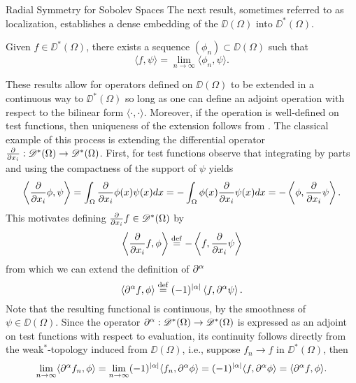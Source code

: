 \begin{chapter}{Radial Symmetry for Sobolev Spaces}
The next result, sometimes referred to as localization, establishes a dense embedding of the $\DD(\Omega)$ into $\DD^*(\Omega)$.
\begin{thm} \label{thm:localization}
  Given $f\in \DD^*(\Omega)$, there exists a sequence $(\phi_n) \subset \DD(\Omega)$ such that 
  \begin{equation}
    \langle f,\psi\rangle = \lim_{n\to\infty}\langle \phi_n,\psi\rangle.
  \end{equation}
\end{thm}

These results allow for operators defined on $\DD(\Omega)$ to be extended in a continuous way to $\DD^*(\Omega)$ so long as one can define an adjoint operation with respect to the bilinear form $\langle \cdot,\cdot \rangle$.
Moreover, if the operation is well-defined on test functions, then uniqueness of the extension follows from .
The classical example of this process is extending the differential operator $\frac{\partial}{\partial x_i}:\mathscr D^*(\Omega) \to \mathscr D^*(\Omega)$. 
First, for test functions observe that integrating by parts and using the compactness of the support of $\psi$ yields
\begin{equation}
  \left\langle \frac{\partial}{\partial x_i} \phi,\psi \right\rangle = \int_{\Omega} \frac{\partial}{\partial x_i} \phi(x) \psi(x) dx = - \int_{\Omega}\phi(x) \frac{\partial}{\partial x_i} \psi(x)dx =- \left\langle \phi, \frac{\partial}{\partial x_i} \psi\right\rangle.
\end{equation}
This motivates defining $\frac{\partial}{\partial x_i} f \in \mathscr D^*(\Omega)$ by
\begin{equation}
  \left\langle \frac{\partial}{\partial x_i} f, \phi \right\rangle 
    \stackrel{\rm def}{=}  - \left\langle f, \frac{\partial}{\partial x_i} \psi\right\rangle
\end{equation}
from which we can extend the definition of $\partial^\alpha$
\begin{equation}\label{eq:distributionalDerivative}
  \left\langle \partial^\alpha f, \phi \right\rangle 
    \stackrel{\rm def}{=}  (-1)^{|\alpha|} \left\langle f, \partial^\alpha \psi\right\rangle.
\end{equation}
Note that the resulting functional is continuous, by the smoothness of $\psi \in \DD(\Omega)$.
Since the operator $\partial^\alpha:\mathscr D^*(\Omega)\to\mathscr D^*(\Omega)$ is expressed as an adjoint on test functions with respect to evaluation, its continuity follows directly from the weak$^*$-topology induced from $\DD(\Omega)$, i.e., suppose $f_n \to f$ in $\DD^*(\Omega)$, then
\begin{align}
  \lim_{n\to \infty}\langle \partial^{\alpha}f_n, \phi\rangle 
  = \lim_{n\to\infty}(-1)^{|\alpha|} \langle f_n,\partial^{\alpha}\phi\rangle
  = (-1)^{|\alpha|} \langle f,\partial^{\alpha}\phi\rangle
  = \langle \partial^{\alpha}f, \phi\rangle.
\end{align}


\end{chapter}
